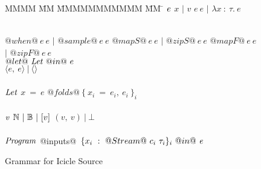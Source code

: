 
\begin{figure}

\begin{tabbing}
MMMM \= MM \= MMMMMMMMMMM \= MM \= \kill
$\mathit{e}$
\GrammarDef $x$
\> $|$ \> $v$
\GrammarAlt $e~e$
\> $|$ \> $\lambda{}x~:~\tau.~e$

\\
\GrammarAlt $@when@~e~e$
\> $|$ \> $@sample@~e~e$
\GrammarAlt $@mapS@~e~e$
\> $|$ \> $@zipS@~e~e$
\GrammarAlt $@mapF@~e~e$
\> $|$ \> $@zipF@~e~e$
\\
\GrammarAlt $@let@~\mathit{Let}~@in@~e$
\\
\GrammarAlt $\langle e,~ e \rangle ~|~ \langle\rangle$
\\
\\

$\mathit{Let}$
\GrammarDef $x~=~e$
\GrammarAlt $@folds@~\{~x_i~=~e_i,~e_i~\}_i$
\\
\\

$\mathit{v}$
\GrammarDef $\mathbb{N} ~|~ \mathbb{B} ~|~ [v]$
\GrammarAlt $(v,~v) ~|~ \bot$
\\
\\


$\mathit{Program}$
\GrammarDef @inputs@~$\{ x_i~:~@Stream@~c_i~\tau_i \}_i~@in@~\mathit{e}$ \\
\end{tabbing}

\caption{Grammar for Icicle Source}
\label{fig:source:grammar}
\end{figure}

